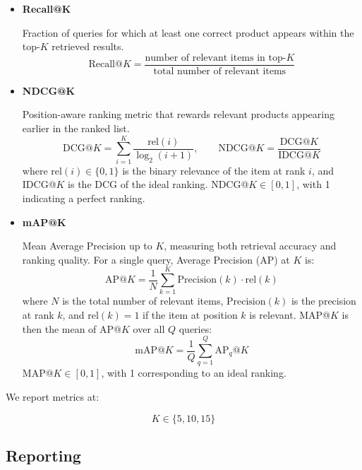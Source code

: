 \documentclass[12pt,a4paper]{article}
\begin{document}
\begin{itemize}[noitemsep]
    \item \textbf{Recall@K}

    Fraction of queries for which at least one correct product appears
    within the top-$K$ retrieved results.
    \begin{equation}
    \text{Recall@}K
    = \frac{\text{number of relevant items in top-}K}
           {\text{total number of relevant items}}
\end{equation}

    \item \textbf{NDCG@K}

    Position-aware ranking metric that rewards relevant products appearing
    earlier in the ranked list.
    \begin{equation}
    \text{DCG@}K = \sum_{i=1}^{K}
        \frac{\mathrm{rel}(i)}{\log_{2}(i+1)},
    \qquad
    \text{NDCG@}K = \frac{\text{DCG@}K}{\text{IDCG@}K}
\end{equation}
where $\mathrm{rel}(i) \in \{0,1\}$ is the binary relevance of the item at
rank $i$, and IDCG@$K$ is the DCG of the ideal ranking.
NDCG@$K \in [0,1]$, with 1 indicating a perfect ranking.


    \item \textbf{mAP@K}

    Mean Average Precision up to $K$, measuring both retrieval accuracy
    and ranking quality.
    For a single query, Average Precision (AP) at $K$ is:
\begin{equation}
    \text{AP@}K
    = \frac{1}{N}\sum_{k=1}^{K} \text{Precision}(k)\cdot\mathrm{rel}(k)
\end{equation}
where $N$ is the total number of relevant items, $\text{Precision}(k)$ is
the precision at rank $k$, and $\mathrm{rel}(k)=1$ if the item at position
$k$ is relevant. MAP@$K$ is then the mean of AP@$K$ over all $Q$ queries:
\begin{equation}
    \text{mAP@}K = \frac{1}{Q}\sum_{q=1}^{Q}\text{AP}_q\text{@}K
\end{equation}
MAP@$K \in [0,1]$, with 1 corresponding to an ideal ranking.
\end{itemize}

We report metrics at:

\[
K \in \{5,10,15\}
\]

\subsection{Reporting}
\end{document}
